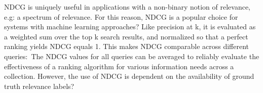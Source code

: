 NDCG is uniquely useful in applications with a non-binary notion of relevance, e.g: a spectrum of relevance. 
For this reason, NDCG is a popular choice for systems with machine learning approaches?
Like precision at k, it is evaluated as a weighted sum over the top k search results, and normalized so that a perfect ranking yields NDCG equals 1.
This makes NDCG comparable across different queries:\
The NDCG values for all queries can be averaged to reliably evaluate the effectiveness of a ranking algorithm for various information needs across a collection.
However, the use of NDCG is dependent on the availability of ground truth relevance labels?